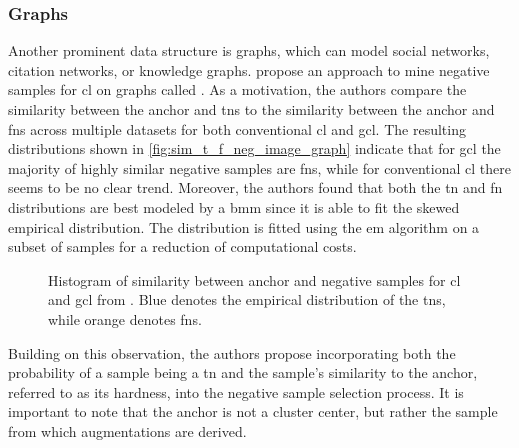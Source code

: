 \subsubsection{Graphs}\label{subsec:graph_distribution}

Another prominent data structure is graphs, which can model 
social networks, citation networks, or knowledge graphs.
\citet{progcl_2022} propose an approach to mine negative samples for \ac{cl} on graphs called \progcl{}. 
As a motivation, the authors compare the similarity between the anchor and \acp{tn} 
to the similarity between the anchor and \acp{fn} 
across multiple datasets for both conventional \ac{cl} and \ac{gcl}.
The resulting distributions shown in \autoref{fig:sim_t_f_neg_image_graph} 
indicate that for \ac{gcl} the majority of highly similar negative samples are \acp{fn}, 
while for conventional \ac{cl} there seems to be no clear trend.
Moreover, the authors found that both the \ac{tn} and \ac{fn} distributions are best modeled by a \acl{bmm} 
since it is able to fit the skewed empirical distribution.
The distribution is fitted using the \ac{em} algorithm on a subset of samples for a reduction of computational costs.

\begin{figure}%
    \centering
    \qquad
    \caption{Histogram of similarity between anchor and negative samples for \ac{cl} and \ac{gcl} from \citet{progcl_2022}.
    Blue denotes the empirical distribution of the \acp{tn}, while orange denotes \acp{fn}.}%
    \label{fig:sim_t_f_neg_image_graph}%
\end{figure}

Building on this observation, the authors propose incorporating both the probability of a sample being a \ac{tn} and 
the sample's similarity to the anchor, referred to as its hardness, into the negative sample selection process. 
It is important to note that the anchor is not a cluster center, 
but rather the sample from which augmentations are derived.

